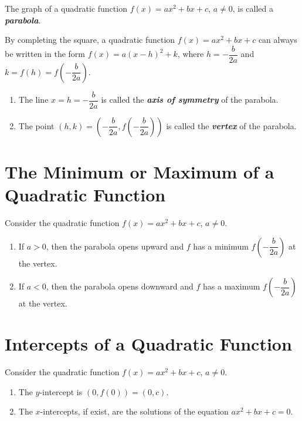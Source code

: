 \documentclass[en,12pt]{elegantbook}
\providecommand{\tightlist}{%
  \setlength{\itemsep}{0pt}\setlength{\parskip}{0pt}}
\begin{document}
The graph of a quadratic function \(f(x)=ax^2+bx+c\), \(a\neq 0\), is called a \textbf{\emph{parabola}}.

By completing the square, a quadratic function \(f(x)=ax^2+bx+c\) can always be written in the form \(f(x)=a(x-h)^2+k\), where \(h=-\dfrac{b}{2a}\) and \(k=f(h)=f\left(-\dfrac{b}{2a}\right)\).

\begin{enumerate}
\def\labelenumi{\arabic{enumi}.}
\tightlist
\item
  The line \(x=h=-\dfrac{b}{2a}\) is called the \textbf{\emph{axis of symmetry}} of the parabola.
\item
  The point \((h, k)=\left(-\dfrac{b}{2a}, f\left(-\dfrac{b}{2a}\right)\right)\) is called the \textbf{\emph{vertex}} of the parabola.
\end{enumerate}

\hypertarget{the-minimum-or-maximum-of-a-quadratic-function}{%
\section{The Minimum or Maximum of a Quadratic Function}\label{the-minimum-or-maximum-of-a-quadratic-function}}

Consider the quadratic function \(f(x)=ax^2+bx+c\), \(a\neq 0\).

\begin{enumerate}
\def\labelenumi{\arabic{enumi}.}
\tightlist
\item
  If \(a>0\), then the parabola opens upward and \(f\) has a minimum \(f\left(-\dfrac{b}{2a}\right)\) at the vertex.
\item
  If \(a<0\), then the parabola opens downward and \(f\) has a maximum \(f\left(-\dfrac{b}{2a}\right)\) at the vertex.
\end{enumerate}

\hypertarget{intercepts-of-a-quadratic-function}{%
\section{Intercepts of a Quadratic Function}\label{intercepts-of-a-quadratic-function}}

Consider the quadratic function \(f(x)=ax^2+bx+c\), \(a\neq 0\).

\begin{enumerate}
\def\labelenumi{\arabic{enumi}.}
\tightlist
\item
  The \(y\)-intercept is \((0, f(0))=(0, c)\).
\item
  The \(x\)-intercepts, if exist, are the solutions of the equation \(ax^2+bx+c=0\).
\end{enumerate}
\end{document}
